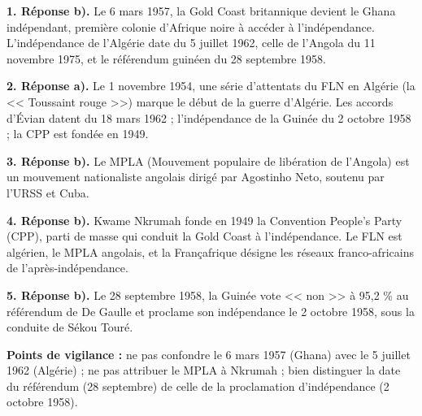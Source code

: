 \documentclass[11pt]{article}
\newcommand{\cle}[1]{{\popxbold\color{popdark}#1}}
\begin{document}
\begin{corrige}
\textbf{1. Réponse b).} Le 6 mars 1957, la Gold Coast britannique devient le \cle{Ghana} indépendant, première colonie d'Afrique noire à accéder à l'indépendance. L'indépendance de l'Algérie date du 5 juillet 1962, celle de l'Angola du 11 novembre 1975, et le référendum guinéen du 28 septembre 1958.

\textbf{2. Réponse a).} Le 1\ier{} novembre 1954, une série d'attentats du \cle{FLN} en Algérie (la << Toussaint rouge >>) marque le début de la guerre d'Algérie. Les accords d'Évian datent du 18 mars 1962 ; l'indépendance de la Guinée du 2 octobre 1958 ; la CPP est fondée en 1949.

\textbf{3. Réponse b).} Le MPLA (Mouvement populaire de libération de l'Angola) est un mouvement nationaliste angolais dirigé par \cle{Agostinho Neto}, soutenu par l'URSS et Cuba.

\textbf{4. Réponse b).} Kwame Nkrumah fonde en 1949 la \cle{Convention People's Party} (CPP), parti de masse qui conduit la Gold Coast à l'indépendance. Le FLN est algérien, le MPLA angolais, et la Françafrique désigne les réseaux franco-africains de l'après-indépendance.

\textbf{5. Réponse b).} Le 28 septembre 1958, la Guinée vote << non >> à 95,2 \% au référendum de De Gaulle et proclame son indépendance le 2 octobre 1958, sous la conduite de Sékou Touré.

\textbf{Points de vigilance :} ne pas confondre le 6 mars 1957 (Ghana) avec le 5 juillet 1962 (Algérie) ; ne pas attribuer le MPLA à Nkrumah ; bien distinguer la date du référendum (28 septembre) de celle de la proclamation d'indépendance (2 octobre 1958).
\end{corrige}
\end{document}
